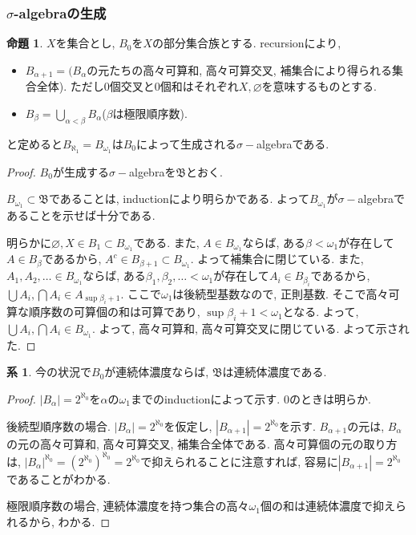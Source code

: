 \documentclass[a4paper, twoside]{bxjsarticle}
\newcommand{\abs}[1]{\left\lvert#1\right\rvert}
\theoremstyle{definition}
\newtheorem{prop}[thm]{命題}
\newtheorem{cor}[thm]{系}
\begin{document}
    \subsubsection{$\sigma$-algebraの生成}
        \begin{prop}
            $X$を集合とし, $B_0$を$X$の部分集合族とする. recursionにより, 
            \begin{itemize}
                \item $B_{\alpha+1}=(B_\alpha$の元たちの高々可算和, 高々可算交叉, 補集合により得られる集合全体). ただし0個交叉と0個和はそれぞれ$X, \varnothing$を意味するものとする.
                \item $B_\beta=\bigcup_{\alpha<\beta}B_\alpha$($\beta$は極限順序数).
            \end{itemize}
            と定めると$B_{\aleph_1}=B_{\omega_1}$は$B_0$によって生成される$\sigma-$algebraである.
        \end{prop}
        \begin{proof}
            $B_0$が生成する$\sigma-$algebraを$\mathfrak{B}$とおく.
            
            $B_{\omega_1}\subset \mathfrak{B}$であることは, inductionにより明らかである. よって$B_{\omega_1}$が$\sigma-$algebraであることを示せば十分である.
            
            明らかに$\varnothing, X\in B_1\subset B_{\omega_1}$である. また, $A\in B_{\omega_1}$ならば, ある$\beta<\omega_1$が存在して$A\in B_\beta$であるから, $A^c\in B_{\beta+1}\subset B_{\omega_1}$. よって補集合に閉じている. また, $A_1, A_2, \dots \in B_{\omega_1}$ならば, ある$\beta_1, \beta_2, \dots <\omega_1$が存在して$A_i\in B_{\beta_i}$であるから, $\bigcup A_i, \bigcap A_i\in A_{\sup\beta_i+1}$. ここで$\omega_1$は後続型基数なので, 正則基数. そこで高々可算な順序数の可算個の和は可算であり, $\sup\beta_i+1<\omega_1$となる. よって, $\bigcup A_i, \bigcap A_i\in B_{\omega_1}$. よって, 高々可算和, 高々可算交叉に閉じている. よって示された. 
        \end{proof}
        
        \begin{cor}
           今の状況で$B_0$が連続体濃度ならば, $\mathfrak{B}$は連続体濃度である.
        \end{cor}
        \begin{proof}
            $\abs{B_\alpha}=2^{\aleph_0}$を$\alpha$の$\omega_1$までのinductionによって示す. 0のときは明らか.
            
            後続型順序数の場合. $\abs{B_\alpha}=2^{\aleph_0}$を仮定し, $\abs{B_{\alpha+1}}=2^{\aleph_0}$を示す. $B_{\alpha+1}$の元は, $B_\alpha$の元の高々可算和, 高々可算交叉, 補集合全体である. 高々可算個の元の取り方は, $\abs{B_\alpha}^{\aleph_0}=(2^{\aleph_0})^{\aleph_0}=2^{\aleph_0}$で抑えられることに注意すれば, 容易に$\abs{B_{\alpha+1}}=2^{\aleph_0}$であることがわかる.
            
            極限順序数の場合, 連続体濃度を持つ集合の高々$\omega_1$個の和は連続体濃度で抑えられるから, わかる.
        \end{proof}
        
\end{document}
